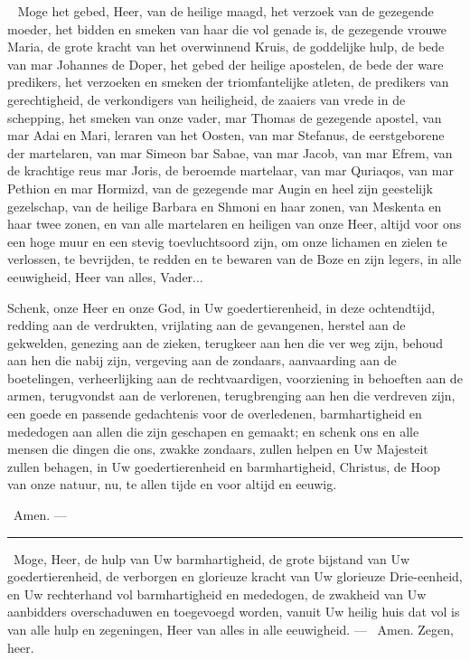 \documentclass[12pt,twoside,a5paper]{article}
\begin{document}
\cc\  Moge het gebed, Heer, van de heilige maagd, het verzoek van de gezegende moeder, het bidden en smeken van haar die vol genade is, de gezegende vrouwe Maria, de grote kracht van het overwinnend Kruis, de goddelijke hulp, de bede van mar Johannes de Doper, het gebed der heilige apostelen, de bede der ware predikers, het verzoeken en smeken der triomfantelijke atleten, de predikers van gerechtigheid, de verkondigers van heiligheid, de zaaiers van vrede in de schepping, het smeken van onze vader, mar Thomas de gezegende apostel, van mar Adai en Mari, leraren van het Oosten, van mar Stefanus, de eerstgeborene der martelaren, van mar Simeon bar Sabae, van mar Jacob, van mar Efrem, van de krachtige reus mar Joris, de beroemde martelaar, van mar Quriaqos, van mar Pethion en mar Hormizd, van de gezegende mar Augin en heel zijn geestelijk gezelschap, van de heilige Barbara en Shmoni en haar zonen, van Meskenta en haar twee zonen, en van alle martelaren en heiligen van onze Heer, altijd voor ons een hoge muur en een stevig toevluchtsoord zijn, om onze lichamen en zielen te verlossen, te bevrijden, te redden en te bewaren van de Boze en zijn legers, in alle eeuwigheid, Heer van alles, Vader...

 Schenk, onze Heer en onze God, in Uw goedertierenheid, in deze ochtendtijd, redding aan de verdrukten, vrijlating aan de gevangenen, herstel aan de gekwelden, genezing aan de zieken, terugkeer aan hen die ver weg zijn, behoud aan hen die nabij zijn, vergeving aan de zondaars, aanvaarding aan de boetelingen, verheerlijking aan de rechtvaardigen, voorziening in behoeften aan de armen, terugvondst aan de verlorenen, terugbrenging aan hen die verdreven zijn, een goede en passende gedachtenis voor de overledenen, barmhartigheid en mededogen aan allen die zijn geschapen en gemaakt; en schenk ons en alle mensen die dingen die ons, zwakke zondaars, zullen helpen en Uw Majesteit zullen behagen, in Uw goedertierenheid en barmhartigheid, Christus, de Hoop van onze natuur, nu, te allen tijde en voor altijd en eeuwig.

\rr\ Amen. --- 

\noindent\rule{\textwidth}{0.5pt}


\cc\ Moge, Heer, de hulp van Uw barmhartigheid, de grote bijstand van Uw goedertierenheid, de verborgen en glorieuze kracht van Uw glorieuze Drie-eenheid, en Uw rechterhand vol barmhartigheid en mededogen, de zwakheid van Uw aanbidders overschaduwen en toegevoegd worden, vanuit Uw heilig huis dat vol is van alle hulp en zegeningen, Heer van alles in alle eeuwigheid. --- \rr\ Amen. Zegen, heer. 
\end{document}
